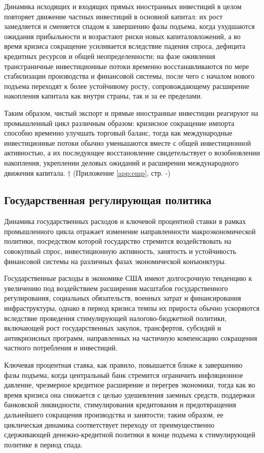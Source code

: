 Динамика исходящих и входящих прямых иностранных инвестиций в целом повторяет движение частных инвестиций в основной капитал: их рост замедляется и сменяется спадом к завершению фазы подъема, когда ухудшаются ожидания прибыльности и возрастают риски новых капиталовложений, а во время кризиса сокращение усиливается вследствие падения спроса, дефицита кредитных ресурсов и общей неопределенности; на фазе оживления трансграничные инвестиционные потоки временно восстанавливаются по мере стабилизации производства и финансовой системы, после чего с началом нового подъема переходят к более устойчивому росту, сопровождающему расширение накопления капитала как внутри страны, так и за ее пределами.

Таким образом, чистый экспорт и прямые иностранные инвестиции реагируют на промышленный цикл различным образом: кризисное сокращение импорта способно временно улучшать торговый баланс, тогда как международные инвестиционные потоки обычно уменьшаются вместе с общей инвестиционной активностью, а их последующее восстановление свидетельствует о возобновлении накопления, укреплении деловых ожиданий и расширении международного движения капитала. $\dagger$ (Приложение \ref{app:emp}, стр. \pageref{fig:net-export}-\pageref{fig:fdi-flow})

\subsection{Государственная регулирующая политика}
Динамика государственных расходов и ключевой процентной ставки в рамках промышленного цикла отражает изменение направленности макроэкономической политики, посредством которой государство стремится воздействовать на совокупный спрос, инвестиционную активность, занятость и устойчивость финансовой системы на различных фазах экономической конъюнктуры.

Государственные расходы в экономике США имеют долгосрочную тенденцию к увеличению под воздействием расширения масштабов государственного регулирования, социальных обязательств, военных затрат и финансирования инфраструктуры, однако в период кризиса темпы их прироста обычно ускоряются вследствие проведения стимулирующей налогово-бюджетной политики, включающей рост государственных закупок, трансфертов, субсидий и антикризисных программ, направленных на частичную компенсацию сокращения частного потребления и инвестиций.

Ключевая процентная ставка, как правило, повышается ближе к завершению фазы подъема, когда центральный банк стремится ограничить инфляционное давление, чрезмерное кредитное расширение и перегрев экономики, тогда как во время кризиса она снижается с целью удешевления заемных средств, поддержки банковской ликвидности, стимулирования кредитования и предотвращения дальнейшего сокращения производства и занятости; таким образом, ее циклическая динамика соответствует переходу от преимущественно сдерживающей денежно-кредитной политики в конце подъема к стимулирующей политике в период спада.

